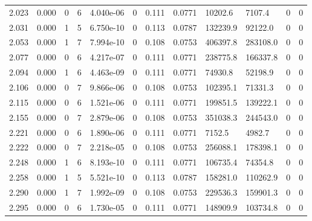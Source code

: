 \documentclass[preview]{standalone}
\begin{document}
{{{\begin{tabular}{L{1.2cm}C{1.2cm} C{0.3cm}C{0.5cm} C{1.4cm}C{1.4cm} C{1.4cm}C{1.4cm} C{1.6cm}C{1.6cm} C{1.6cm}C{1.6cm}}
  2.023  &  0.000  & 0     &  6 &  4.040e-06  & 0  &  0.111&   0.0771& 10202.6 & 7107.4   &  0 & 0  \\ 
  2.031  &  0.000  & 1     &  5 &  6.750e-10  & 0  &  0.113&   0.0787& 132239.9 & 92122.0   &  0 & 0  \\ 
  2.053  &  0.000  & 1     &  7 &  7.994e-10  & 0  &  0.108&   0.0753& 406397.8 & 283108.0   &  0 & 0  \\ 
  2.077  &  0.000  & 0     &  6 &  4.217e-07  & 0  &  0.111&   0.0771& 238775.8 & 166337.8   &  0 & 0  \\ 
  2.094  &  0.000  & 1     &  6 &  4.463e-09  & 0  &  0.111&   0.0771& 74930.8 & 52198.9   &  0 & 0  \\ 
  2.106  &  0.000  & 0     &  7 &  9.866e-06  & 0  &  0.108&   0.0753& 102395.1 & 71331.3   &  0 & 0  \\ 
  2.115  &  0.000  & 0     &  6 &  1.521e-06  & 0  &  0.111&   0.0771& 199851.5 & 139222.1   &  0 & 0  \\ 
  2.155  &  0.000  & 0     &  7 &  2.879e-06  & 0  &  0.108&   0.0753& 351038.3 & 244543.0   &  0 & 0  \\ 
  2.221  &  0.000  & 0     &  6 &  1.890e-06  & 0  &  0.111&   0.0771& 7152.5 & 4982.7   &  0 & 0  \\ 
  2.222  &  0.000  & 0     &  7 &  2.218e-05  & 0  &  0.108&   0.0753& 256088.1 & 178398.1   &  0 & 0  \\ 
  2.248  &  0.000  & 1     &  6 &  8.193e-10  & 0  &  0.111&   0.0771& 106735.4 & 74354.8   &  0 & 0  \\ 
  2.258  &  0.000  & 1     &  5 &  5.521e-10  & 0  &  0.113&   0.0787& 158281.0 & 110262.9   &  0 & 0  \\ 
  2.290  &  0.000  & 1     &  7 &  1.992e-09  & 0  &  0.108&   0.0753& 229536.3 & 159901.3   &  0 & 0  \\ 
  2.295  &  0.000  & 0     &  6 &  1.730e-05  & 0  &  0.111&   0.0771& 148909.9 & 103734.8   &  0 & 0  \\ 
\hline 
\end{tabular} 

}}}
\end{document}
